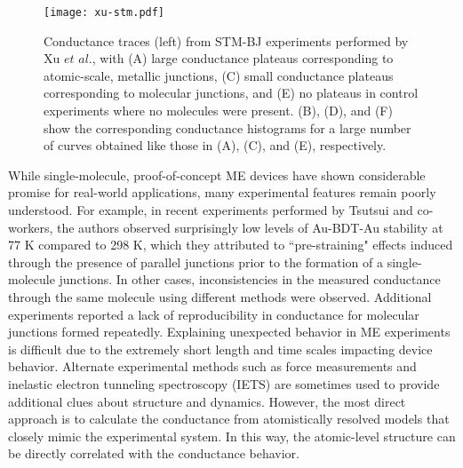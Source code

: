 \documentclass[10pt]{report}  %
\begin{document}

%
% 
%
\begin{figure}[t!]
	\centering
	\texttt{[image: xu-stm.pdf]}
	\caption{Conductance traces (left) from STM-BJ experiments performed by Xu $et$ $al.$, \protect\cite{Xu:2003} with (A) large conductance plateaus corresponding to atomic-scale, metallic junctions, (C) small conductance plateaus corresponding to molecular junctions, and (E) no plateaus in control experiments where no molecules were present. (B), (D), and (F) show the corresponding conductance histograms for a large number of curves obtained like those in (A), (C), and (E), respectively.   }
	\label{fig:xu-stm}
\end{figure}



While single-molecule, proof-of-concept ME devices have shown considerable promise for real-world applications, many experimental features remain poorly understood. For example, in recent experiments performed by Tsutsui and co-workers, \cite{Tsutsui:2009} the authors observed surprisingly low levels of Au-BDT-Au stability at 77 K compared to 298 K, which they attributed to ``pre-straining" effects induced through the presence of parallel junctions prior to the formation of a single-molecule junctions. In other cases, inconsistencies in the measured conductance through the same molecule using different methods were observed.\cite{Lindsay:2007,Haiss:2009} Additional experiments reported a lack of reproducibility in conductance for molecular junctions formed repeatedly. \cite{Ulrich:2006,Venkataraman:2006}  Explaining unexpected behavior in ME experiments is difficult due to the extremely short length and time scales impacting device behavior. Alternate experimental methods such as force measurements \cite{Frei:2011,Frei:2012} and inelastic electron tunneling spectroscopy (IETS)\cite{Song:2009,Tsutsui:2009-nanoscale,Kim:2011,Bruot:2012}  are sometimes used to provide additional clues about structure and dynamics. However, the most direct approach is to calculate the conductance from atomistically resolved models that closely mimic the experimental system. \cite{Weber:2002,Leary:2009,Kamenetska:2009,Mishchenko:2010,Fatemi:2011,Cheng:2011} In this way, the atomic-level structure can be directly correlated with the conductance behavior.
\end{document}
